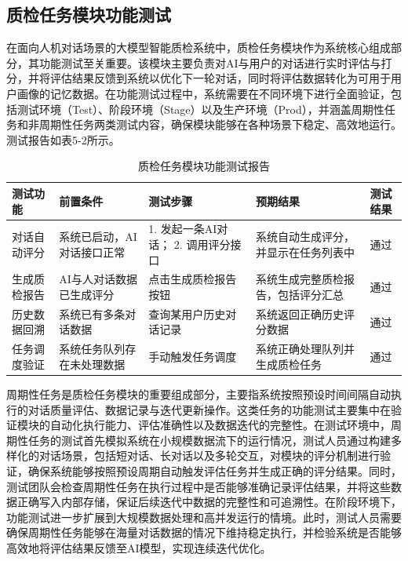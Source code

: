 \subsection{质检任务模块功能测试}
在面向人机对话场景的大模型智能质检系统中，质检任务模块作为系统核心组成部分，其功能测试至关重要。该模块主要负责对AI与用户的对话进行实时评估与打分，并将评估结果反馈到系统以优化下一轮对话，同时将评估数据转化为可用于用户画像的记忆数据。在功能测试过程中，系统需要在不同环境下进行全面验证，包括测试环境（Test）、阶段环境（Stage）以及生产环境（Prod），并涵盖周期性任务和非周期性任务两类测试内容，确保模块能够在各种场景下稳定、高效地运行。测试报告如表5-2所示。
\begin{table}[htb]
\centering
\caption{质检任务模块功能测试报告}
\label{tab:quality-task-test}
{\renewcommand{\arraystretch}{1.2}
\begin{tabular}{p{3cm} p{2cm} p{2cm} p{3cm} p{2cm}}
\hline
测试功能 & 前置条件 & 测试步骤 & 预期结果 & 测试结果 \\
\hline
对话自动评分 & 系统已启动，AI对话接口正常 & 1. 发起一条AI对话； 2. 调用评分接口 & 系统自动生成评分，并显示在任务列表中 & 通过 \\ \hline
生成质检报告 & AI与人对话数据已生成评分 & 点击生成质检报告按钮 & 系统生成完整质检报告，包括评分汇总 & 通过 \\ \hline
历史数据回溯 & 系统已有多条对话数据 & 查询某用户历史对话记录 & 系统返回正确历史评分数据 & 通过 \\ \hline
任务调度验证 & 系统任务队列存在未处理数据 & 手动触发任务调度 & 系统正确处理队列并生成质检任务 & 通过 \\
\hline
\end{tabular}}
\end{table}

周期性任务是质检任务模块的重要组成部分，主要指系统按照预设时间间隔自动执行的对话质量评估、数据记录与迭代更新操作。这类任务的功能测试主要集中在验证模块的自动化执行能力、评估准确性以及数据迭代的完整性。在测试环境中，周期性任务的测试首先模拟系统在小规模数据流下的运行情况，测试人员通过构建多样化的对话场景，包括短对话、长对话以及多轮交互，对模块的评分机制进行验证，确保系统能够按照预设周期自动触发评估任务并生成正确的评分结果。同时，测试团队会检查周期性任务在执行过程中是否能够准确记录评估结果，并将这些数据正确写入内部存储，保证后续迭代中数据的完整性和可追溯性。在阶段环境下，功能测试进一步扩展到大规模数据处理和高并发运行的情境。此时，测试人员需要确保周期性任务能够在海量对话数据的情况下维持稳定执行，并检验系统是否能够高效地将评估结果反馈至AI模型，实现连续迭代优化。

